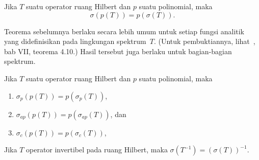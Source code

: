 \begin{thm}\label{SMThm} Jika $T$ suatu operator ruang Hilbert dan $p$ suatu polinomial, maka
   \[ \sigma(p(T)) = p(\sigma(T)). \]
\end{thm}

Teorema sebelumnya berlaku secara lebih umum untuk setiap fungsi analitik yang didefinisikan pada lingkungan spektrum~$T$.
(Untuk pembuktiannya, lihat~\cite{Conway:1990}, bab VII, teorema 4.10.) Hasil tersebut juga berlaku untuk bagian-bagian spektrum.

\begin{prop} Jika $T$ suatu operator ruang Hilbert dan $p$ suatu polinomial, maka
   \begin{enumerate}[label=\rm{(\alph*)}]
     \item $\sigma_p(p(T)) = p(\sigma_p(T))$,
     \item $\sigma_{ap}(p(T)) = p(\sigma_{ap}(T))$, dan
     \item $\sigma_c(p(T)) = p(\sigma_c(T))$,
   \end{enumerate}
\end{prop}

\begin{prop}
    Jika $T$ operator invertibel pada ruang Hilbert, maka $\sigma(T^{-1}) = (\sigma(T))^{-1}$.
\end{prop}
